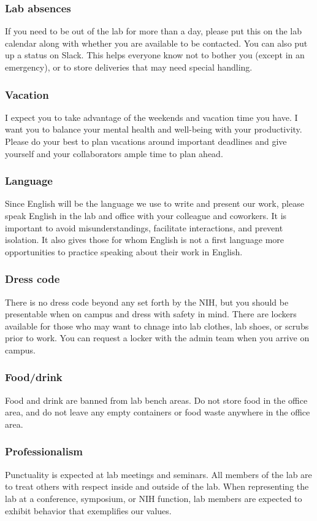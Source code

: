\documentclass[10pt, a4paper, twocolumn]{article} %
\begin{document}
\subsubsection{Lab absences} If you need to be out of the lab for more than a day, please put this on the lab calendar along with whether you are available to be contacted. You can also put up a status on Slack. This helps everyone know not to bother you (except in an emergency), or to store deliveries that may need special handling.
\subsubsection{Vacation} I expect you to take advantage of the weekends and vacation time you have. I want you to balance your mental health and well-being with your productivity. Please do your best to plan vacations around important deadlines and give yourself and your collaborators ample time to plan ahead.
\subsubsection{Language}
Since English will be the language we use to write and present our work, please speak English in the lab and office with your colleague and coworkers. It is important to avoid misunderstandings, facilitate interactions, and prevent isolation. It also gives those for whom English is not a first language more opportunities to practice speaking about their work in English.
\subsubsection{Dress code} There is no dress code beyond any set forth by the NIH, but you should be presentable when on campus and dress with safety in mind. There are lockers available for those who may want to chnage into lab clothes, lab shoes, or scrubs prior to work. You can request a locker with the admin team when you arrive on campus.
\subsubsection{Food/drink} Food and drink are banned from lab bench areas. Do not store food in the office area, and do not leave any empty containers or food waste anywhere in the office area.
\subsubsection{Professionalism} Punctuality is expected at lab meetings and seminars. All members of the lab are to treat others with respect inside and outside of the lab. When representing the lab at a conference, symposium, or NIH function, lab members are expected to exhibit behavior that exemplifies our values.
\end{document}
